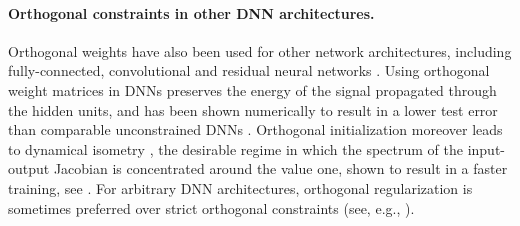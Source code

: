 \documentclass{article}
\begin{document}
\paragraph{Orthogonal constraints in other DNN architectures.} Orthogonal weights have also been used for other network architectures, including fully-connected, convolutional and residual neural networks \cite{Ozay2016,Huang2018,Huang2020,Bansal2018,Jia2020}. Using orthogonal weight matrices in DNNs preserves the energy of the signal propagated through the hidden units, and has been shown numerically to result in a lower test error than comparable unconstrained DNNs \cite{Huang2018,Jia2020}. Orthogonal initialization moreover leads to dynamical isometry \cite{Pennington2017}, the desirable regime in which the spectrum of the input-output Jacobian is concentrated around the value one, shown to result in a faster training, see \cite{Pennington2017,Hu2020,murray2021}. For arbitrary DNN architectures, orthogonal regularization is sometimes preferred over strict orthogonal constraints (see, e.g., \cite{Jia2017,Yoshida2017,Bansal2018}). 
\end{document}
